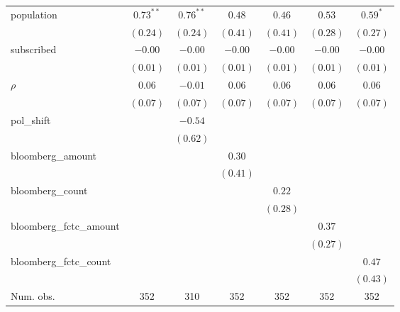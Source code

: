 \begin{table}[!h]
\begin{center}
\begin{tabular}{l c c c c c c }
population              & $0.73^{**}$  & $0.76^{**}$  & $0.48$       & $0.46$       & $0.53$       & $0.59^{*}$   \\
                        & $(0.24)$     & $(0.24)$     & $(0.41)$     & $(0.41)$     & $(0.28)$     & $(0.27)$     \\
subscribed              & $-0.00$      & $-0.00$      & $-0.00$      & $-0.00$      & $-0.00$      & $-0.00$      \\
                        & $(0.01)$     & $(0.01)$     & $(0.01)$     & $(0.01)$     & $(0.01)$     & $(0.01)$     \\
$\rho$                  & $0.06$       & $-0.01$      & $0.06$       & $0.06$       & $0.06$       & $0.06$       \\
                        & $(0.07)$     & $(0.07)$     & $(0.07)$     & $(0.07)$     & $(0.07)$     & $(0.07)$     \\
pol\_shift              &              & $-0.54$      &              &              &              &              \\
                        &              & $(0.62)$     &              &              &              &              \\
bloomberg\_amount       &              &              & $0.30$       &              &              &              \\
                        &              &              & $(0.41)$     &              &              &              \\
bloomberg\_count        &              &              &              & $0.22$       &              &              \\
                        &              &              &              & $(0.28)$     &              &              \\
bloomberg\_fctc\_amount &              &              &              &              & $0.37$       &              \\
                        &              &              &              &              & $(0.27)$     &              \\
bloomberg\_fctc\_count  &              &              &              &              &              & $0.47$       \\
                        &              &              &              &              &              & $(0.43)$     \\
\midrule
Num. obs.               & 352          & 310          & 352          & 352          & 352          & 352          \\

\end{tabular}
\end{center}
\end{table}
